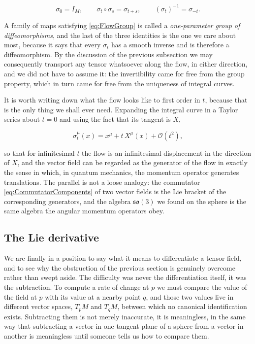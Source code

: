         \begin{equation}\label{eq:FlowGroup}
            \sigma_0 = I_M, \qquad \sigma_t\circ\sigma_s = \sigma_{t+s}, \qquad \left(\sigma_t\right)^{-1} = \sigma_{-t}.
        \end{equation}

        A family of maps satisfying \ref{eq:FlowGroup} is called a \textit{one-parameter group of diffeomorphisms}, and the last of the three identities is the one we care about most, because it says that every $\sigma_t$ has a smooth inverse and is therefore a diffeomorphism. By the discussion of the previous subsection we may consequently transport any tensor whatsoever along the flow, in either direction, and we did not have to assume it: the invertibility came for free from the group property, which in turn came for free from the uniqueness of integral curves.

        It is worth writing down what the flow looks like to first order in $t$, because that is the only thing we shall ever need. Expanding the integral curve in a Taylor series about $t=0$ and using the fact that its tangent is $X$,

        \begin{equation}\label{eq:FlowFirstOrder}
            \sigma_t^{\mu}(x) = x^{\mu} + t\,X^{\mu}(x) + \mathcal{O}(t^2),
        \end{equation}

        so that for infinitesimal $t$ the flow is an infinitesimal displacement in the direction of $X$, and the vector field can be regarded as the generator of the flow in exactly the sense in which, in quantum mechanics, the momentum operator generates translations. The parallel is not a loose analogy: the commutator \ref{eq:CommutatorComponents} of two vector fields is the Lie bracket of the corresponding generators, and the algebra $\mathfrak{so}(3)$ we found on the sphere is the same algebra the angular momentum operators obey.

    \subsection{The Lie derivative}

        We are finally in a position to say what it means to differentiate a tensor field, and to see why the obstruction of the previous section is genuinely overcome rather than swept aside. The difficulty was never the differentiation itself, it was the subtraction. To compute a rate of change at $p$ we must compare the value of the field at $p$ with its value at a nearby point $q$, and those two values live in different vector spaces, $T_pM$ and $T_qM$, between which no canonical identification exists. Subtracting them is not merely inaccurate, it is meaningless, in the same way that subtracting a vector in one tangent plane of a sphere from a vector in another is meaningless until someone tells us how to compare them.

